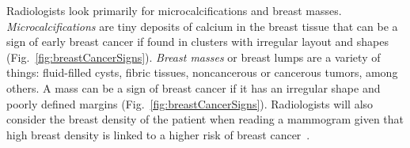 Radiologists look primarily for microcalcifications and breast masses. \emph{Microcalcifications} are tiny deposits of calcium in the breast tissue that can be a sign of early breast cancer if found in clusters with irregular layout and shapes (Fig.~\ref{fig:breastCancerSigns}). \emph{Breast masses} or breast lumps are a variety of things: fluid-filled cysts, fibric tissues, noncancerous or cancerous tumors, among others. A mass can be a sign of breast cancer if it has an irregular shape and poorly defined margins (Fig.~\ref{fig:breastCancerSigns}). Radiologists will also consider the breast density of the patient when reading a mammogram given that high breast density is linked to a higher risk of breast cancer~\cite{ACS2014}.

